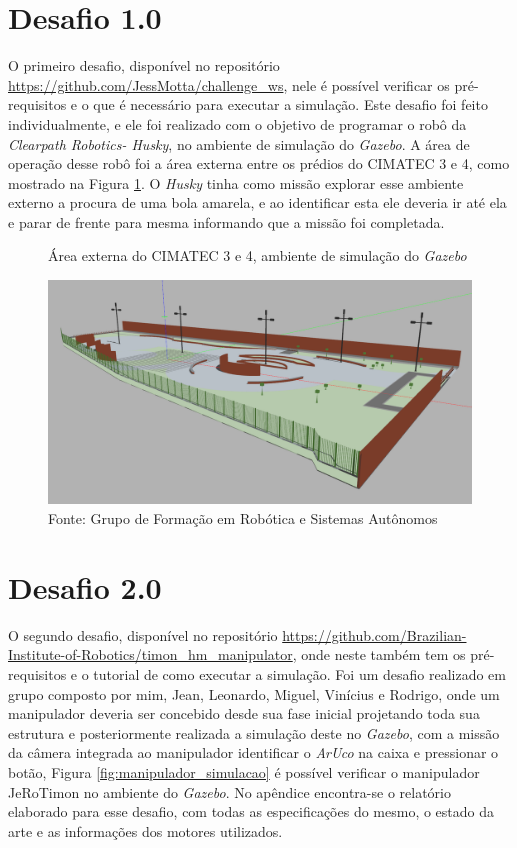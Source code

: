 \section{Desafio 1.0 }
\label{sec:desafio_1}
O primeiro desafio, disponível no repositório \url{https://github.com/JessMotta/challenge_ws}, nele é possível verificar os pré-requisitos e o que é necessário para executar a simulação. Este desafio foi feito individualmente, e ele foi realizado com o objetivo de programar o robô da \textit{Clearpath Robotics- Husky}, no ambiente de simulação do \textit{Gazebo}. A área de operação desse robô foi a área externa entre os prédios do CIMATEC 3 e 4, como mostrado na Figura \ref{fig:cimatec3_4}. O \textit{Husky} tinha como missão explorar esse ambiente externo a procura de uma bola amarela, e ao identificar esta ele deveria ir até ela e parar de frente para mesma informando que a missão foi completada.  


\begin{figure}[H]
    \caption{Área externa do CIMATEC 3 e 4, ambiente de simulação do \textit{Gazebo}}
    \centering
    \includegraphics[width= \textwidth]{Figures/cimatec4.png}
    \caption*{Fonte: Grupo de Formação em Robótica e Sistemas Autônomos}
    \label{fig:cimatec3_4}
\end{figure}



\section{Desafio 2.0 }
\label{sec:desafio_2}
O segundo desafio, disponível no repositório \url{https://github.com/Brazilian-Institute-of-Robotics/timon\_hm\_manipulator}, onde neste também tem os pré-requisitos e o tutorial de como executar a simulação. Foi um desafio realizado em grupo composto por mim, Jean, Leonardo, Miguel, Vinícius e Rodrigo, onde um manipulador deveria ser concebido desde sua fase inicial projetando toda sua estrutura e posteriormente realizada a simulação deste no \textit{Gazebo}, com a missão da câmera integrada ao manipulador identificar o \textit{ArUco} na caixa e pressionar o botão, Figura \ref{fig:manipulador_simulacao} é possível verificar o manipulador JeRoTimon no ambiente do \textit{Gazebo}. No apêndice encontra-se o relatório elaborado para esse desafio, com todas as especificações do mesmo, o estado da arte e as informações dos motores utilizados.

